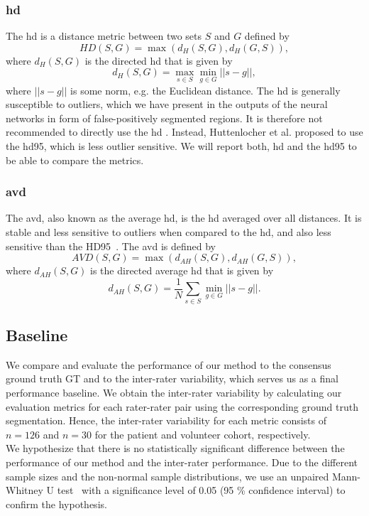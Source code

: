 \subsubsection{\acrlong{hd}}
The \gls{hd} is a distance metric between two sets $S$ and $G$ defined by
\begin{equation}
   HD(S, G) = \max(d_{H}(S,G),d_{H}(G,S)),
   \label{eq:hd}
\end{equation}
where $d_{H}(S,G)$ is the directed \gls{hd} that is given by
\begin{equation}
   d_{H}(S, G) = \max\limits_{s \in S} \min\limits_{g \in G} ||s-g||,
   \label{eq:dhd}
\end{equation}
where $||s-g||$ is some norm, e.g. the Euclidean distance. The \gls{hd} is generally susceptible to outliers, which we have present in the outputs of the neural networks in form of false-positively segmented regions. It is therefore not recommended to directly use the \acrshort{hd} \cite{Taha2015MetricsTool}. Instead, Huttenlocher et al. \cite{Huttenlocher1993ComparingDistance} proposed to use the \gls{hd95}, which is less outlier sensitive. We will report both, \gls{hd} and the \gls{hd95} to be able to compare the metrics.

\subsubsection{\acrlong{avd}}
The \gls{avd}, also known as the average \gls{hd}, is the \gls{hd} averaged over all distances. It is stable and less sensitive to outliers when compared to the \gls{hd}, and also less sensitive than the HD95~\cite{Taha2015MetricsTool}. The \gls{avd} is defined by
\begin{equation}
   AVD(S, G) = \max(d_{AH}(S,G),d_{AH}(G,S)),
   \label{eq:avd}
\end{equation}
where $d_{AH}(S,G)$ is the directed average \gls{hd} that is given by
\begin{equation}
   d_{AH}(S, G) = \frac{1}{N} \sum\limits_{s \in S} \min\limits_{g \in G} ||s-g||.
   \label{eq:dahd}
\end{equation}

\subsection{Baseline} \label{sec:eval_baseline}
We compare and evaluate the performance of our method to the consensus ground truth GT and to the inter-rater variability, which serves us as a final performance baseline. We obtain the inter-rater variability by calculating our evaluation metrics for each rater-rater pair using the corresponding ground truth segmentation. Hence, the inter-rater variability for each metric consists of $n = 126$ and $n = 30$ for the patient and volunteer cohort, respectively.\\
We hypothesize that there is no statistically significant difference between the performance of our method and the inter-rater performance. Due to the different sample sizes and the non-normal sample distributions, we use an unpaired Mann-Whitney U test~\cite{Mann1947OnOther} with a significance level of 0.05 (95 \% confidence interval) to confirm the hypothesis.

